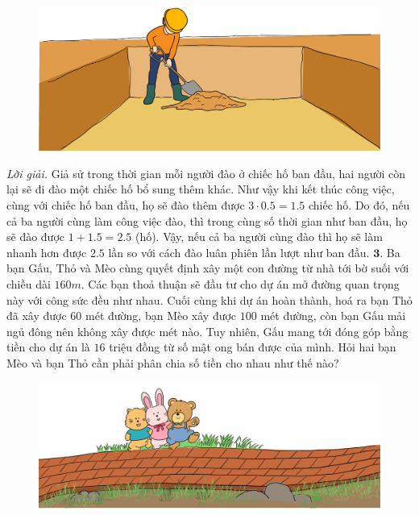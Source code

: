 \begin{multicols}{2}
\begin{figure}[H]
		\centering
		\vspace*{-5pt}
		\captionsetup{labelformat= empty, justification=centering}
		\includegraphics[width=1\linewidth]{Pi7_bai2}
		\vspace*{-20pt}
	\end{figure}
	\textit{Lời giải.} 	Giả sử trong thời gian mỗi người đào ở chiếc hố ban đầu, hai người còn lại sẽ đi đào một chiếc hố bổ sung thêm khác. Như vậy khi kết thúc công việc, cùng với chiếc hố ban đầu, họ sẽ đào thêm được $3\cdot 0{.}5 = 1{.}5$ chiếc hố. Do đó, nếu cả ba người cùng làm công việc đào, thì trong cùng số thời gian như ban đầu, họ sẽ đào được $1+1{.}5=2{.}5$ (hố). Vậy, nếu cả ba người cùng đào thì họ sẽ làm nhanh hơn được $2{.}5$ lần so với cách đào luân phiên lần lượt như ban đầu.
	\vskip 0.1cm
	$\pmb{3.}$ Ba bạn Gấu, Thỏ và Mèo cùng quyết định xây một con đường từ nhà tới bờ suối với chiều dài $160m$. Các bạn thoả thuận sẽ đầu tư cho dự án mở đường quan trọng này với công sức đều như nhau. Cuối cùng khi dự án hoàn thành, hoá ra bạn Thỏ đã xây được $60$ mét đường, bạn Mèo xây được $100$ mét đường, còn bạn Gấu mải ngủ đông nên không xây được mét nào. Tuy nhiên, Gấu mang tới đóng góp bằng tiền cho dự án là $16$ triệu đồng từ số mật ong bán được của mình. Hỏi hai bạn Mèo và bạn Thỏ cần phải phân chia số tiền cho nhau như thế nào?
	\begin{figure}[H]
		\centering
		\vspace*{-5pt}
		\captionsetup{labelformat= empty, justification=centering}
		\includegraphics[width=1\linewidth]{Pi7_bai3}

\end{figure}
\end{multicols}

